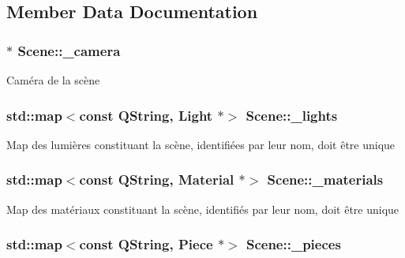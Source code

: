 \subsection{Member Data Documentation}
\hypertarget{class_scene_a8cce9e0f96edc8655a9b9a885e2c26bf}{
\subsubsection[{\+\_\+camera}]{$\ast$ Scene\+::\+\_\+camera}}\label{class_scene_a8cce9e0f96edc8655a9b9a885e2c26bf}
Caméra de la scène \hypertarget{class_scene_ab1c7bd9112003b236d22dd2d1b58600e}{
\subsubsection[{\+\_\+lights}]{\setlength{\rightskip}{0pt plus 5cm}std\+::map$<$const Q\+String, {\bf Light} $\ast$$>$ Scene\+::\+\_\+lights\hspace{0.3cm}{\ttfamily [private]}}}\label{class_scene_ab1c7bd9112003b236d22dd2d1b58600e}
Map des lumières constituant la scène, identifiées par leur nom, doit être unique \hypertarget{class_scene_a274f93689f4fc827fe6fb215081898d6}{
\subsubsection[{\+\_\+materials}]{\setlength{\rightskip}{0pt plus 5cm}std\+::map$<$const Q\+String, {\bf Material} $\ast$$>$ Scene\+::\+\_\+materials\hspace{0.3cm}{\ttfamily [private]}}}\label{class_scene_a274f93689f4fc827fe6fb215081898d6}
Map des matériaux constituant la scène, identifiés par leur nom, doit être unique \hypertarget{class_scene_afd5f6ed4171e34cd2d185cd7638ed40f}{
\subsubsection[{\+\_\+pieces}]{\setlength{\rightskip}{0pt plus 5cm}std\+::map$<$const Q\+String, {\bf Piece} $\ast$$>$ Scene\+::\+\_\+pieces\hspace{0.3cm}{\ttfamily [private]}}}\label{class_scene_afd5f6ed4171e34cd2d185cd7638ed40f}
